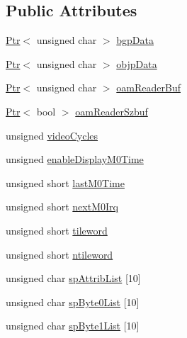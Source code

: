 \subsection*{Public Attributes}
\begin{DoxyCompactItemize}
\item 
\hyperlink{classgambatte_1_1SaveState_1_1Ptr}{Ptr}$<$ unsigned char $>$ \hyperlink{structgambatte_1_1SaveState_1_1PPU_aa76c0d6395f65bdfe6984b15c715ccdc}{bgp\+Data}
\item 
\hyperlink{classgambatte_1_1SaveState_1_1Ptr}{Ptr}$<$ unsigned char $>$ \hyperlink{structgambatte_1_1SaveState_1_1PPU_accaae5e4c05b6af8897b50767084d99c}{objp\+Data}
\item 
\hyperlink{classgambatte_1_1SaveState_1_1Ptr}{Ptr}$<$ unsigned char $>$ \hyperlink{structgambatte_1_1SaveState_1_1PPU_a07a06820413808bfc11ebb06d1ef2052}{oam\+Reader\+Buf}
\item 
\hyperlink{classgambatte_1_1SaveState_1_1Ptr}{Ptr}$<$ bool $>$ \hyperlink{structgambatte_1_1SaveState_1_1PPU_a1f41bd53d646bd6c5ed0bae3169c28fb}{oam\+Reader\+Szbuf}
\item 
unsigned \hyperlink{structgambatte_1_1SaveState_1_1PPU_a3c84cd6d28569d76001f0e2ec4bc5320}{video\+Cycles}
\item 
unsigned \hyperlink{structgambatte_1_1SaveState_1_1PPU_ae54e3b44537658fb80f8d75a2b653607}{enable\+Display\+M0\+Time}
\item 
unsigned short \hyperlink{structgambatte_1_1SaveState_1_1PPU_a54292ce6465993422fcb2a0151c4532c}{last\+M0\+Time}
\item 
unsigned short \hyperlink{structgambatte_1_1SaveState_1_1PPU_aabf33f08f8637993ef8c8ae9d15c3010}{next\+M0\+Irq}
\item 
unsigned short \hyperlink{structgambatte_1_1SaveState_1_1PPU_a33cc35ba7ac5d270121fe3bc1059f4e9}{tileword}
\item 
unsigned short \hyperlink{structgambatte_1_1SaveState_1_1PPU_ad8a9a6132afb9c6978f5fedb8627a093}{ntileword}
\item 
unsigned char \hyperlink{structgambatte_1_1SaveState_1_1PPU_ad5e4e377c6d8b48baa7473d5e0b7bdcb}{sp\+Attrib\+List} \mbox{[}10\mbox{]}
\item 
unsigned char \hyperlink{structgambatte_1_1SaveState_1_1PPU_a9b357530d61e861ff2b690be5023f353}{sp\+Byte0\+List} \mbox{[}10\mbox{]}
\item 
unsigned char \hyperlink{structgambatte_1_1SaveState_1_1PPU_a7611df8b8268ec5b522a7bc5c76f569e}{sp\+Byte1\+List} \mbox{[}10\mbox{]}
\item 

\end{DoxyCompactItemize}
